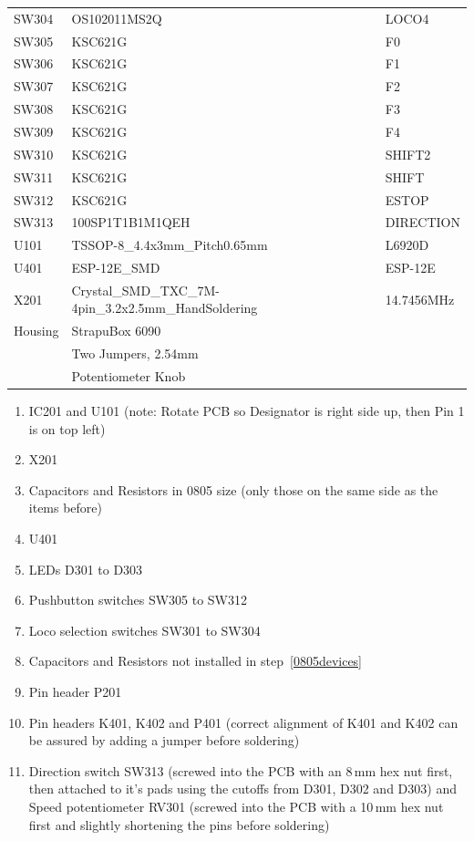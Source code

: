 \documentclass[11pt,a4paper]{scrartcl}
\begin{document}
\begin{table}
\begin{footnotesize}
\begin{tabular}{|m{5em}|l|l|}
    SW304 & OS102011MS2Q & LOCO4 \\
    SW305 & KSC621G & F0 \\
    SW306 & KSC621G & F1 \\
    SW307 & KSC621G & F2 \\
    SW308 & KSC621G & F3 \\
    SW309 & KSC621G & F4 \\
    SW310 & KSC621G & SHIFT2 \\
    SW311 & KSC621G & SHIFT \\
    SW312 & KSC621G & ESTOP \\
    SW313 & 100SP1T1B1M1QEH & DIRECTION \\
    U101 & TSSOP-8\_4.4x3mm\_Pitch0.65mm & L6920D \\
    U401 & ESP-12E\_SMD & ESP-12E \\
    X201 & Crystal\_SMD\_TXC\_7M-4pin\_3.2x2.5mm\_HandSoldering & 14.7456MHz \\
    \hline
    Housing & StrapuBox 6090 & \\
    & Two Jumpers, 2.54mm & \\
    & Potentiometer Knob & \\
    \hline
  \end{tabular}
  \end{footnotesize}
\end{table}

\begin{enumerate}
\item IC201 and U101 (note: Rotate PCB so Designator is right side up, then Pin 1 is on top left)
\item X201
\item Capacitors and Resistors in 0805 size (only those on the same side as the items before) \label{0805devices}
\item U401
\item LEDs D301 to D303
\item Pushbutton switches SW305 to SW312
\item Loco selection switches SW301 to SW304
\item Capacitors and Resistors not installed in step~\ref{0805devices}
\item Pin header P201
\item Pin headers K401, K402 and P401 (correct alignment of K401 and K402 can be assured by adding a jumper before soldering)
\item Direction switch SW313 (screwed into the PCB with an 8\,mm hex nut first, then attached to it's pads using the cutoffs from D301, D302 and D303) and Speed potentiometer RV301 (screwed into the PCB with a 10\,mm hex nut first and slightly shortening the pins before soldering)
\end{enumerate}
\end{document}
